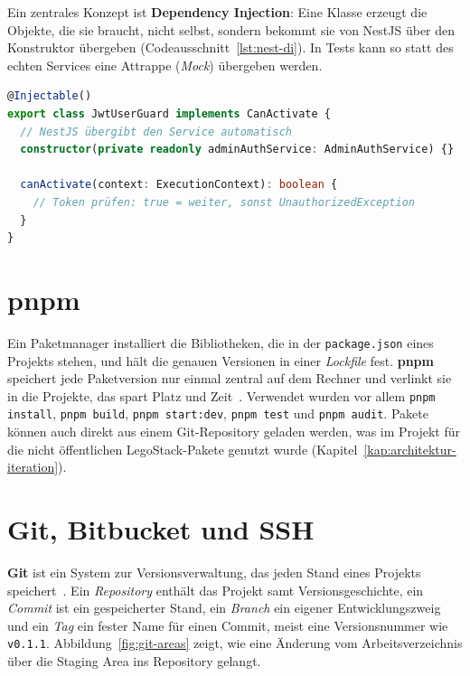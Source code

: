 Ein zentrales Konzept ist \textbf{Dependency Injection}: Eine Klasse erzeugt die Objekte, die sie braucht, nicht selbst, sondern bekommt sie von NestJS über den Konstruktor übergeben (Codeausschnitt~\ref{lst:nest-di}). In Tests kann so statt des echten Services eine Attrappe (\emph{Mock}) übergeben werden.

\begin{lstlisting}[language=TypeScript, caption={Guard mit Dependency Injection (gekürzt aus \texttt{jwtUser.guard.ts})}, label={lst:nest-di}]
@Injectable()
export class JwtUserGuard implements CanActivate {
  // NestJS übergibt den Service automatisch
  constructor(private readonly adminAuthService: AdminAuthService) {}

  canActivate(context: ExecutionContext): boolean {
    // Token prüfen: true = weiter, sonst UnauthorizedException
  }
}
\end{lstlisting}

\section{pnpm}
\label{sec:pnpm}

Ein Paketmanager installiert die Bibliotheken, die in der \texttt{package.json} eines Projekts stehen, und hält die genauen Versionen in einer \emph{Lockfile} fest. \textbf{pnpm} speichert jede Paketversion nur einmal zentral auf dem Rechner und verlinkt sie in die Projekte, das spart Platz und Zeit~\cite{pnpm}. Verwendet wurden vor allem \texttt{pnpm install}, \texttt{pnpm build}, \texttt{pnpm start:dev}, \texttt{pnpm test} und \texttt{pnpm audit}. Pakete können auch direkt aus einem Git-Repository geladen werden, was im Projekt für die nicht öffentlichen LegoStack-Pakete genutzt wurde (Kapitel~\ref{kap:architektur-iteration}).

\section{Git, Bitbucket und SSH}
\label{sec:git}
\label{sec:ssh}

\textbf{Git} ist ein System zur Versionsverwaltung, das jeden Stand eines Projekts speichert~\cite{git}. Ein \emph{Repository} enthält das Projekt samt Versionsgeschichte, ein \emph{Commit} ist ein gespeicherter Stand, ein \emph{Branch} ein eigener Entwicklungszweig und ein \emph{Tag} ein fester Name für einen Commit, meist eine Versionsnummer wie \texttt{v0.1.1}. Abbildung~\ref{fig:git-areas} zeigt, wie eine Änderung vom Arbeitsverzeichnis über die Staging Area ins Repository gelangt.

